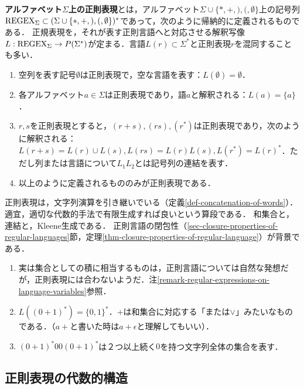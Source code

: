 \documentclass[uplatex, dvipdfmx]{jsreport}
\begin{document}
\begin{definition}
    \textbf{アルファベット$\Sigma$上の正則表現}とは，アルファベット$\Sigma\cup\{*,+,),(,\emptyset\}$上の記号列$\mathrm{REGEX}_{\Sigma}\subset (\Sigma\cup\{*,+,),(,\emptyset\})^*$であって，次のように帰納的に定義されるものである．
    正規表現を，それが表す正則言語へと対応させる解釈写像$L:\mathrm{REGEX}_{\Sigma}\to P(\Sigma^*)$が定まる．言語$L(r)\subset\Sigma^*$と正則表現$r$を混同することも多い．
    \begin{enumerate}
        \item 空列を表す記号$\emptyset$は正則表現で，空な言語を表す：$L(\emptyset)=\emptyset$．
        \item 各アルファベット$a\in\Sigma$は正則表現であり，語$a$と解釈される：$L(a)=\{a\}$．
        \item $r,s$を正則表現とすると，$(r+s),(rs),(r^*)$は正則表現であり，次のように解釈される：$L(r+s)=L(r)\cup L(s), L(rs)=L(r)L(s),L(r^*)=L(r)^*$．ただし列または言語について$L_1L_2$とは記号列の連結を表す．
        \item 以上のように定義されるもののみが正則表現である．
    \end{enumerate}
\end{definition}
\begin{remarks}
    正則表現は，文字列演算を引き継いでいる（定義\ref{def-concatenation-of-words}）．
    適宜，適切な代数的手法で有限生成すれば良いという算段である．
    和集合と，連結と，Kleene生成である．
    正則言語の閉包性（\ref{sec-closure-properties-of-regular-languages}節，定理\ref{thm-closure-properties-of-regular-language}）が背景である．
\end{remarks}
\begin{example}\mbox{}
    \begin{enumerate}
        \item 実は集合としての積に相当するものは，正則言語については自然な発想だが，正則表現には合わないようだ．注\ref{remark-regular-expressions-on-language-variables}参照．
        \item $L((0+1)^*)=\{0,1\}^*$．$+$は和集合に対応する「または$\lor$」みたいなものである．（$a+$と書いた時は$a+\epsilon$と理解してもいい）．
        \item $(0+1)^*00(0+1)^*$は２つ以上続く$0$を持つ文字列全体の集合を表す．
    \end{enumerate}
\end{example}

\subsection{正則表現の代数的構造}
\end{document}
